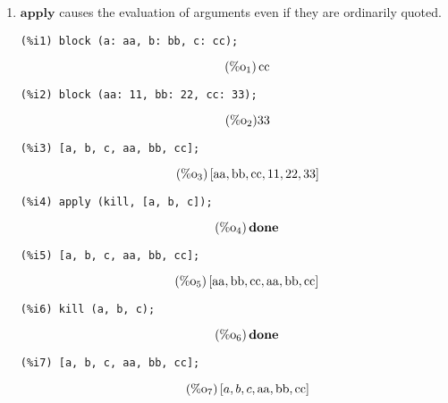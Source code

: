 \documentclass[12pt,leqno]{article}
\begin{document}
\begin{enumerate}
\item $\mathbf{apply}$ causes the evaluation of arguments even if they are ordinarily quoted.
\begin{verbatim}
(%i1) block (a: aa, b: bb, c: cc);
\end{verbatim}
\begin{equation}
\tag{$\mathop{\mathrm{\%o}}_{1}$}\mathop{\mathrm{cc}}
\label{eq:doc-group1-code19-1-1}
\end{equation}
\begin{verbatim}
(%i2) block (aa: 11, bb: 22, cc: 33);
\end{verbatim}
\begin{equation}
\tag{$\mathop{\mathrm{\%o}}_{2}$}33
\label{eq:doc-group1-code19-2-1}
\end{equation}
\begin{verbatim}
(%i3) [a, b, c, aa, bb, cc];
\end{verbatim}
\begin{equation}
\tag{$\mathop{\mathrm{\%o}}_{3}$}\left[\mathop{\mathrm{aa}}, \mathop{\mathrm{bb}}, \mathop{\mathrm{cc}}, 11, 22, 33\right]
\label{eq:doc-group1-code19-3-1}
\end{equation}
\begin{verbatim}
(%i4) apply (kill, [a, b, c]);
\end{verbatim}
\begin{equation}
\tag{$\mathop{\mathrm{\%o}}_{4}$}\mathop{\mathbf{done}}
\label{eq:doc-group1-code19-4-1}
\end{equation}
\begin{verbatim}
(%i5) [a, b, c, aa, bb, cc];
\end{verbatim}
\begin{equation}
\tag{$\mathop{\mathrm{\%o}}_{5}$}\left[\mathop{\mathrm{aa}}, \mathop{\mathrm{bb}}, \mathop{\mathrm{cc}}, \mathop{\mathrm{aa}}, \mathop{\mathrm{bb}}, \mathop{\mathrm{cc}}\right]
\label{eq:doc-group1-code19-5-1}
\end{equation}
\begin{verbatim}
(%i6) kill (a, b, c);
\end{verbatim}
\begin{equation}
\tag{$\mathop{\mathrm{\%o}}_{6}$}\mathop{\mathbf{done}}
\label{eq:doc-group1-code19-6-1}
\end{equation}
\begin{verbatim}
(%i7) [a, b, c, aa, bb, cc];
\end{verbatim}
\begin{equation}
\tag{$\mathop{\mathrm{\%o}}_{7}$}\left[a, b, c, \mathop{\mathrm{aa}}, \mathop{\mathrm{bb}}, \mathop{\mathrm{cc}}\right]
\label{eq:doc-group1-code19-7-1}
\end{equation}



\end{enumerate}
\end{document}

